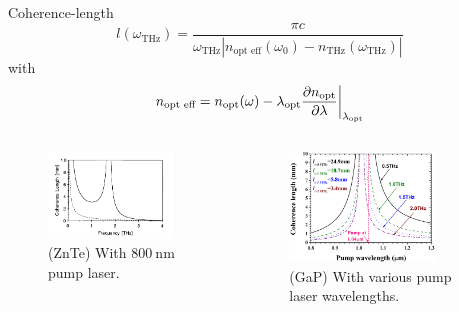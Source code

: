 \documentclass[aspectratio=1610, 9pt]{beamer}
\begin{document}
\begin{frame}{Coherence-length}
\begin{equation}
    l(\omega_{\text{THz}}) = \frac{\pi c}{\omega_{\text{THz}} \left | n_\text{opt eff}(\omega_0) - n_{\text{THz}}(\omega_{\text{THz}})\right |}
\end{equation}
with 
\begin{equation}
    n_{\text{opt eff}} = n_\text{opt}(\omega) - \lambda_\text{opt}\frac{\partial n_\text{opt}}{\partial \lambda}\biggl{|}_{\lambda_\text{opt}}  
\end{equation}
\begin{center}
  \begin{columns}
    \begin{column}{.4\textwidth}
    \begin{figure}
      \includegraphics[width=0.9\textwidth]{images/coherence_length_ZnTe.png}
      \caption{(ZnTe) With $\SI{800}{\nano\meter}$ pump laser.}
    \end{figure}%
    \end{column}
    \begin{column}{.4\textwidth}
    \begin{figure}
      \includegraphics[width=0.8\textwidth]{images/GAP_coherencelength.png}
      \caption{(GaP) With various pump laser wavelengths.}
    \end{figure}
    \end{column}
  \end{columns}
\end{center}
\end{frame}
\end{document}

